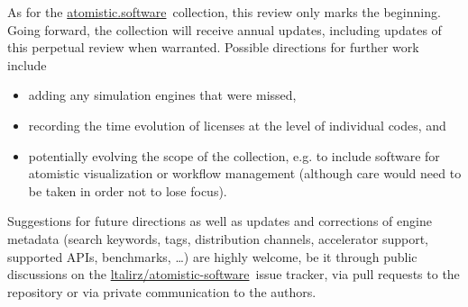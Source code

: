 \documentclass[9pt,review,ASAPversion]{livecoms}
\newcommand{\atsoft}{\href{https://atomistic.software}{atomistic.software}\ }
\newcommand{\atsoftgit}{\href{https://github.com/ltalirz/atomistic-software}{ltalirz/atomistic-software}\ }
\begin{document}
As for the \atsoft collection, this review only marks the beginning.
Going forward, the collection will receive annual updates, including updates of this perpetual review when warranted.
Possible directions for further work include
\begin{itemize}
    \item 
adding any simulation engines that were missed, 
    \item 
recording the time evolution of licenses at the level of individual codes, and
    \item 
potentially evolving the scope of the collection, e.g. to include software for atomistic visualization or workflow management (although care would need to be taken in order not to lose focus).
\end{itemize}
Suggestions for future directions as well as updates and corrections of engine metadata (search keywords, tags, distribution channels, accelerator support, supported APIs, benchmarks, \ldots) are highly welcome,
be it through public discussions on the \atsoftgit issue tracker, via pull requests to the repository or via private communication to the authors.








\end{document}
